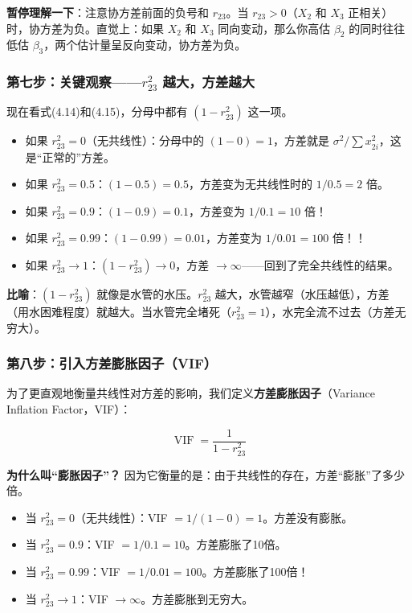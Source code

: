 \documentclass[12pt,a4paper]{ctexart}
\newcommand{\VIF}{\operatorname{VIF}}
\begin{document}
\textbf{暂停理解一下}：注意协方差前面的负号和 $r_{23}$。当 $r_{23} > 0$（$X_2$ 和 $X_3$ 正相关）时，协方差为负。直觉上：如果 $X_2$ 和 $X_3$ 同向变动，那么你高估 $\beta_2$ 的同时往往低估 $\beta_3$，两个估计量呈反向变动，协方差为负。

\subsubsection{第七步：关键观察——$r_{23}^2$ 越大，方差越大}

现在看式(4.14)和(4.15)，分母中都有 $(1 - r_{23}^2)$ 这一项。

\begin{itemize}
    \item 如果 $r_{23}^2 = 0$（无共线性）：分母中的 $(1-0)=1$，方差就是 $\sigma^2/\sum x_{2i}^2$，这是“正常的”方差。
    \item 如果 $r_{23}^2 = 0.5$：$(1-0.5)=0.5$，方差变为无共线性时的 $1/0.5 = 2$ 倍。
    \item 如果 $r_{23}^2 = 0.9$：$(1-0.9)=0.1$，方差变为 $1/0.1 = 10$ 倍！
    \item 如果 $r_{23}^2 = 0.99$：$(1-0.99)=0.01$，方差变为 $1/0.01 = 100$ 倍！！
    \item 如果 $r_{23}^2 \to 1$：$(1-r_{23}^2) \to 0$，方差 $\to \infty$——回到了完全共线性的结果。
\end{itemize}

\textbf{比喻}：$(1-r_{23}^2)$ 就像是水管的水压。$r_{23}^2$ 越大，水管越窄（水压越低），方差（用水困难程度）就越大。当水管完全堵死（$r_{23}^2 = 1$），水完全流不过去（方差无穷大）。

\subsubsection{第八步：引入方差膨胀因子（VIF）}

为了更直观地衡量共线性对方差的影响，我们定义\textbf{方差膨胀因子}（Variance Inflation Factor，VIF）：

\begin{equation}
\VIF = \frac{1}{1 - r_{23}^2} \tag{4.17}
\end{equation}

\textbf{为什么叫“膨胀因子”？} 因为它衡量的是：由于共线性的存在，方差“膨胀”了多少倍。

\begin{itemize}
    \item 当 $r_{23}^2 = 0$（无共线性）：VIF $= 1/(1-0) = 1$。方差没有膨胀。
    \item 当 $r_{23}^2 = 0.9$：VIF $= 1/0.1 = 10$。方差膨胀了10倍。
    \item 当 $r_{23}^2 = 0.99$：VIF $= 1/0.01 = 100$。方差膨胀了100倍！
    \item 当 $r_{23}^2 \to 1$：VIF $\to \infty$。方差膨胀到无穷大。
\end{itemize}
\end{document}
